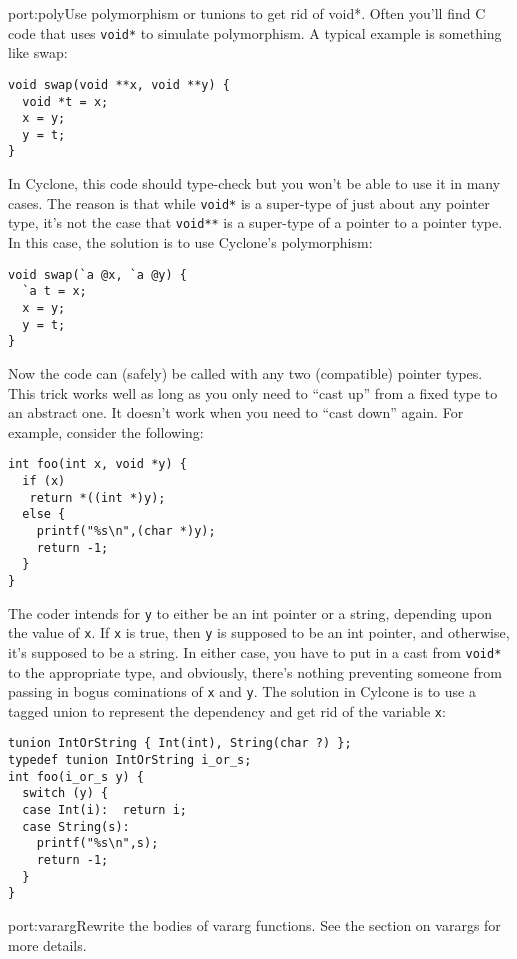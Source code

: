 \begin{porta}{port:poly}{Use polymorphism or tunions to get rid of void*.}  
Often you'll find C code that uses \texttt{void*} to simulate
polymorphism.  A typical example is something like swap:
\begin{verbatim}
void swap(void **x, void **y) {
  void *t = x;
  x = y;
  y = t;
}
\end{verbatim}

In Cyclone, this code should type-check but you won't be able
to use it in many cases.  The reason is that while \texttt{void*}
is a super-type of just about any pointer type, it's not the
case that \texttt{void**} is a super-type of a pointer to a
pointer type.  In this case, the solution is to use Cyclone's
polymorphism:
\begin{verbatim}
void swap(`a @x, `a @y) {
  `a t = x;
  x = y;
  y = t;
}
\end{verbatim}

Now the code can (safely) be called with any two (compatible)
pointer types.  This trick works well as long as you only need
to ``cast up'' from a fixed type to an abstract one.  It doesn't
work when you need to ``cast down'' again.  For example, consider
the following:
\begin{verbatim}
int foo(int x, void *y) {
  if (x)
   return *((int *)y);
  else {
    printf("%s\n",(char *)y);
    return -1;
  }
}
\end{verbatim}

The coder intends for \texttt{y} to either be an int pointer or
a string, depending upon the value of \texttt{x}.  If \texttt{x}
is true, then \texttt{y} is supposed to be an int pointer, and
otherwise, it's supposed to be a string.  In either case, you have
to put in a cast from \texttt{void*} to the appropriate type,
and obviously, there's nothing preventing someone from passing
in bogus cominations of \texttt{x} and \texttt{y}.  The solution
in Cylcone is to use a tagged union to represent the dependency
and get rid of the variable \texttt{x}:
\begin{verbatim}
tunion IntOrString { Int(int), String(char ?) };
typedef tunion IntOrString i_or_s;
int foo(i_or_s y) {
  switch (y) {
  case Int(i):  return i;
  case String(s):  
    printf("%s\n",s);
    return -1;
  }
}
\end{verbatim}
\end{porta}

\begin{porta}{port:vararg}{Rewrite the bodies of vararg functions.}
See the section on varargs for more details.  
\end{porta}

